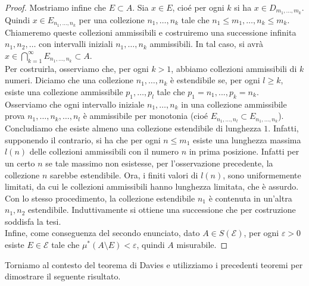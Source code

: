 \documentclass[a4paper, twoside,openright]{article}
\newcommand{\<}{\langle}
\renewcommand{\>}{\rangle}
\begin{document}
\begin{proof}
	Mostriamo infine che $E \subset A$. Sia $x \in E$, cioé per ogni $k$ si ha $x \in D_{m_{1}, \ldots, m_{k}}$. Quindi $x \in E_{n_{1}, \ldots, n_{k}}$ per una collezione $n_{1}, \ldots, n_{k}$ tale che $n_{1} \leq m_{1}, \ldots, n_{k} \leq m_{k}$.\\
	Chiameremo queste collezioni ammissibili e costruiremo una successione infinita $n_{1}, n_{2}, \ldots$ con intervalli iniziali $n_{1}, \ldots, n_{k}$ ammissibili.	In tal caso, si avrà $x \in \bigcap_{k=1}^{\infty} E_{n_{1}, \ldots, n_{k}} \subset A$.\\
	Per costruirla, osserviamo che, per ogni $k>1$, abbiamo collezioni ammissibili di $k$ numeri. Diciamo che una collezione $n_{1}, \ldots, n_{k}$ è estendibile se, per ogni $l \geq k$, esiste una collezione ammissibile $p_{1}, \ldots, p_{l}$ tale che $p_1=n_1,...,p_k=n_k$.\\
	Osserviamo che ogni intervallo iniziale $n_{1}, \ldots, n_{k}$ in una collezione ammissibile prova $n_{1}, \ldots, n_{k}, \ldots, n_{l}$ è ammissibile per monotonia (cioé $E_{n_{1}, \ldots, n_{l}} \subset E_{n_{1}, \ldots, n_{k}}$).\\
	Concludiamo che esiste almeno una collezione estendibile di lunghezza $1$. Infatti, supponendo il contrario, si ha che per ogni $n \leq m_{1}$ esiste una lunghezza massima $l(n)$ delle collezioni ammissibili con il numero $n$ in prima posizione. Infatti per un certo $n$ se tale massimo non esistesse, per l'osservazione precedente, la collezione $n$ sarebbe estendibile. Ora, i finiti valori di $l(n)$, sono uniformemente limitati, da cui le collezioni ammissibili hanno lunghezza limitata, che è assurdo.\\
	Con lo stesso procedimento, la collezione estendibile $n_{1}$ è contenuta in un'altra $n_{1}, n_{2}$ estendibile. Induttivamente si ottiene una successione che per costruzione soddisfa la tesi.\\
	Infine, come conseguenza del secondo enunciato, dato $A \in S(\mathcal{E})$, per ogni $\varepsilon >0$ esiste $E \in \mathcal{E}$ tale che $\mu^*(A \setminus E) < \varepsilon$, quindi $A$ misurabile.

\end{proof}

Torniamo al contesto del teorema di Davies e utilizziamo i precedenti teoremi per dimostrare il seguente risultato.
\end{document}
